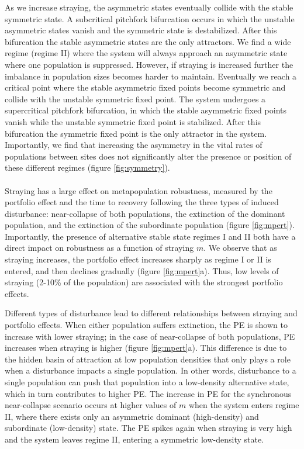 \documentclass{revtex4}
\begin{document}
As we increase straying, the asymmetric states eventually collide with the stable symmetric state. 
A subcritical pitchfork bifurcation occurs in which the unstable asymmetric states vanish and the symmetric state is destabilized. 
After this bifurcation the stable asymmetric states are the only attractors. 
We find a wide regime (regime II) where the system will always approach an asymmetric state where one population is suppressed. 
However, if straying is increased further the imbalance in population sizes becomes harder to maintain. 
Eventually we reach a critical point where the stable asymmetric fixed points become symmetric and collide with the unstable symmetric fixed point. 
The system undergoes a supercritical pitchfork bifurcation, in which the stable asymmetric fixed points vanish while the unstable symmetric fixed point is stabilized. 
After this bifurcation the symmetric fixed point is the only attractor in the system. 
Importantly, we find that increasing the asymmetry in the vital rates of populations between sites does not significantly alter the presence or position of these different regimes (figure \ref{fig:symmetry}).\\


 \\
Straying has a large effect on metapopulation robustness, measured by the portfolio effect and the time to recovery following the three types of induced disturbance: near-collapse of both populations, the extinction of the dominant population, and the extinction of the subordinate population (figure \ref{fig:mpert}).
Importantly, the presence of alternative stable state regimes I and II both have a direct impact on robustness as a function of straying $m$.
We observe that as straying increases, the portfolio effect increases sharply as regime I or II is entered, and then declines gradually (figure \ref{fig:mpert}a).
Thus, low levels of straying (2-10\% of the population) are associated with the strongest portfolio effects.

Different types of disturbance lead to different relationships between straying and portfolio effects.
When either population suffers extinction, the PE is shown to increase with lower straying; in the case of near-collapse of both populations, PE increases when straying is higher (figure \ref{fig:mpert}a).
This difference is due to the hidden basin of attraction at low population densities that only plays a role when a disturbance impacts a single population.
In other words, disturbance to a single population can push that population into a low-density alternative state, which in turn contributes to higher PE.
The increase in PE for the synchronous near-collapse scenario occurs at higher values of $m$ when the system enters regime II, where there exists only an asymmetric dominant (high-density) and subordinate (low-density) state.
The PE spikes again when straying is very high and the system leaves regime II, entering a symmetric low-density state.
\end{document}
